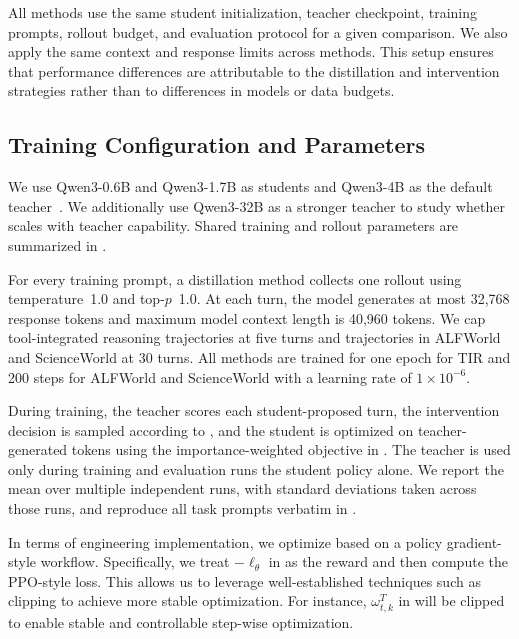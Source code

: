 All methods use the same student initialization, teacher checkpoint, training prompts, rollout budget, and evaluation protocol for a given comparison.  
We also apply the same context and response limits across methods. 
This setup ensures that performance differences are attributable to the distillation and intervention strategies rather than to differences in models or data budgets. 

\subsection{Training Configuration and Parameters}
\label{app:training_parameters}

We use Qwen3-0.6B and Qwen3-1.7B as students and Qwen3-4B as the default teacher~\citep{abs-2505-09388}.  
We additionally use Qwen3-32B as a stronger teacher to study whether \name scales with teacher capability. 
Shared training and rollout parameters are summarized in .

For every training prompt, a distillation method collects one rollout using temperature~1.0 and top-$p$~1.0. 
At each turn, the model generates at most 32,768 response tokens and maximum model context length is 40,960 tokens.  
We cap tool-integrated reasoning trajectories at five turns and trajectories in ALFWorld and ScienceWorld at 30 turns. 
All methods are trained for one epoch for TIR and 200 steps for ALFWorld and ScienceWorld with a learning rate of $1\times10^{-6}$.

During \name training, the teacher scores each student-proposed turn, the intervention decision is sampled according to , and the student is optimized on teacher-generated tokens using the importance-weighted objective in . 
The teacher is used only during training and evaluation runs the student policy alone. 
We report the mean over multiple independent runs, with standard deviations taken across those runs, and
reproduce all task prompts verbatim in . 

In terms of engineering implementation, we optimize \name based on a policy gradient-style workflow. 
Specifically, we treat $-\ell_\theta$ in  as the reward and then compute the PPO-style loss. 
This allows us to leverage well-established techniques such as clipping to achieve more stable optimization. 
For instance, $\omega^{T}_{t,k}$ in  will be clipped to enable stable and controllable step-wise optimization. 

